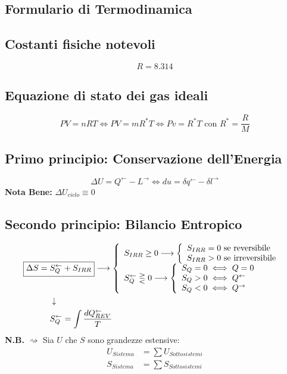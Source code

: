 \documentclass[a4paper]{report}
\begin{document}
\begin{center}
\section*{Formulario di Termodinamica}
\end{center}   


\subsection*{Costanti fisiche notevoli}
\[
   R = 8.314
\]

\subsection*{Equazione di stato dei gas ideali}
\[
   \boxed{PV=nRT} \iff \boxed{PV=mR^*T} \iff \boxed{Pv=R^*T} \text{ con } R^*=\frac{R}{M}
\]

\subsection*{Primo principio: Conservazione dell'Energia}
\[
    \boxed{\Delta U = Q^\leftarrow - L^\rightarrow} \iff \boxed{du = \delta q^\leftarrow - \delta l^\rightarrow}
\]
\textbf{Nota Bene: } $\Delta U_{ciclo} \equiv 0$

\subsection*{Secondo principio: Bilancio Entropico}
\begin{align*}
    \Aboxed{\Delta S  = & S_Q^\leftarrow + S_{IRR}} \longrightarrow \left\{\begin{array}{l}
        S_{IRR}\geq 0 \longrightarrow \left\{\begin{array}{l}
            S_{IRR} = 0 \text{ se reversibile}\\
            S_{IRR} > 0 \text{ se irreversibile}
        \end{array}\right.\\
        S_Q^\leftarrow \gtreqless 0 \longrightarrow \left\{\begin{array}{l}
            S_Q =  0 \iff Q=0\\
            S_Q > 0 \iff Q^\leftarrow \\
            S_Q < 0 \iff Q^\rightarrow
        \end{array}\right.
    \end{array}\right. \\
    &\downarrow \\
    & S_Q^\leftarrow = \int \frac{dQ^\leftarrow_{REV}}{T}
\end{align*}
\textbf{N.B.} $\rightsquigarrow$ Sia $U$ che $S$ sono grandezze estensive:
\begin{align*}
    U_{Sistema} &= \sum U_{Sottosistemi} \\
    S_{Sistema} &= \sum S_{Sottosistemi}
\end{align*}
\end{document}
